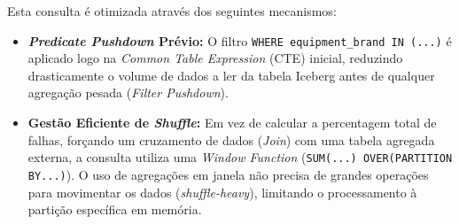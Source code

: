 Esta consulta é otimizada através dos seguintes mecanismos:
\begin{itemize}
	\item \textbf{\textit{Predicate Pushdown} Prévio:} O filtro \texttt{WHERE equipment\_brand IN (...)} é aplicado logo na \textit{Common Table Expression} (CTE) inicial, reduzindo drasticamente o volume de dados a ler da tabela Iceberg antes de qualquer agregação pesada (\textit{Filter Pushdown}).
	
	\item \textbf{Gestão Eficiente de \textit{Shuffle}:} Em vez de calcular a percentagem total de falhas, forçando um cruzamento de dados (\textit{Join}) com uma tabela agregada externa, a consulta utiliza uma \textit{Window Function} (\texttt{SUM(...) OVER(PARTITION BY...)}). O uso de agregações em janela não precisa de grandes operações para movimentar os dados (\textit{shuffle-heavy}), limitando o processamento à partição específica em memória.
\end{itemize}